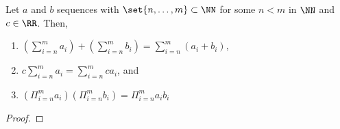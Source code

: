 \guard




\begin{thm}
\label{thm:sumProductDistribution}
  Let $a$ and $b$ sequences with $\set{n,\dots,m}\subset\NN$ for some $n<m$ in $\NN$ and $c\in\RR$.
  Then,
  \begin{enumerate}
    \item $\left( \sum_{i=n}^m a_i\right) + \left( \sum_{i=n}^m b_i\right) = \sum_{i=n}^m (a_i + b_i)$,
    \item $c\sum_{i=n}^m a_i = \sum_{i=n}^m ca_i$, and
    \item $\left( \Pi_{i=n}^m a_i\right)\left( \Pi_{i=n}^m b_i\right) = \Pi_{i=n}^m a_ib_i$
  \end{enumerate}
\end{thm}
\begin{proof}
\end{proof}
